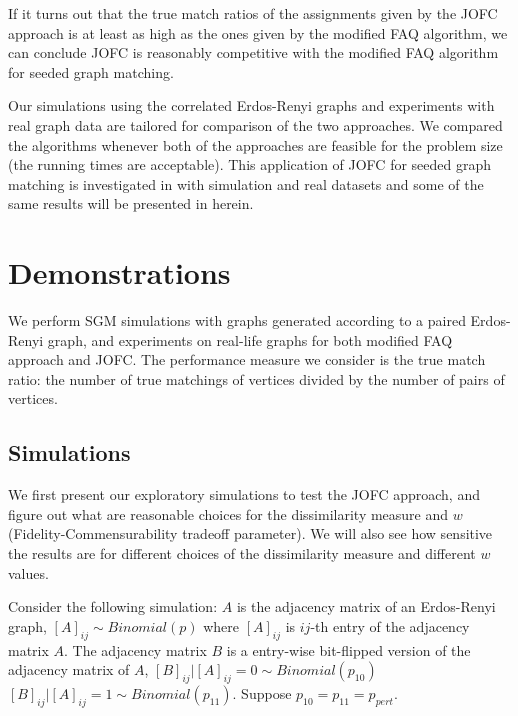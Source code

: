 \documentclass[12pt,oneside,final]{thesis}
\begin{document}
If it turns out that the true match ratios of the assignments given by the JOFC approach is at least as high as the ones given by the modified FAQ algorithm, we can conclude JOFC is reasonably competitive with the modified FAQ algorithm for seeded graph matching. 

Our simulations using the correlated Erdos-Renyi graphs and experiments with real graph data are tailored for comparison of  the two approaches. We compared the algorithms whenever both of the approaches   are  feasible for the problem size (the running times are acceptable). 
 This application of JOFC for seeded graph matching is  investigated  in \cite{SGMviaJOFC} with simulation and real datasets and some of the same results will be presented in herein.
 

 
 \section{Demonstrations}

We perform SGM simulations with graphs generated according to a paired Erdos-Renyi graph, and experiments on real-life graphs for  both modified FAQ approach and JOFC. The performance measure we consider is the true match ratio: the number of true matchings of vertices  divided by the number of pairs of vertices.

\subsection{Simulations}


  We first present our exploratory simulations to  test the JOFC approach, and figure out what are reasonable choices for  the dissimilarity measure and $w$ (Fidelity-Commensurability tradeoff parameter). We will also  see how sensitive the results are for different choices of the dissimilarity measure and different $w$ values. 
 
  Consider the following simulation: $A$ is the adjacency matrix of an Erdos-Renyi graph, \ie
  $\left[A\right]_{ij} \sim Binomial(p)$ where $\left[A\right]_{ij}$ is $ij$-th entry of the adjacency matrix  $A$. The adjacency matrix  $B$ is a entry-wise bit-flipped version of the adjacency matrix of $A$, \ie
    $\left[B\right]_{ij}|\left[A\right]_{ij}=0 \sim Binomial(p_{10})$ $\left[B\right]_{ij}|\left[A\right]_{ij}=1 \sim Binomial(p_{11})$. Suppose $p_{10}=p_{11}=p_{pert}$.
  
\end{document}
